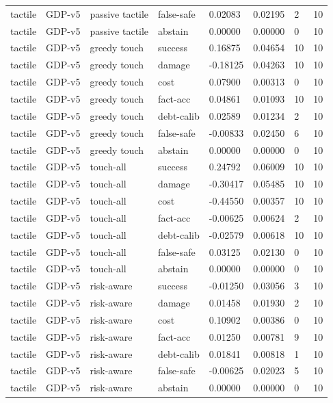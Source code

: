\documentclass{article}
\begin{document}
\begin{center}
\begin{longtable}{llllllll}
tactile & GDP-v5 & passive tactile & false-safe & 0.02083 & 0.02195 & 2 & 10 \\
tactile & GDP-v5 & passive tactile & abstain & 0.00000 & 0.00000 & 0 & 10 \\
tactile & GDP-v5 & greedy touch & success & 0.16875 & 0.04654 & 10 & 10 \\
tactile & GDP-v5 & greedy touch & damage & -0.18125 & 0.04263 & 10 & 10 \\
tactile & GDP-v5 & greedy touch & cost & 0.07900 & 0.00313 & 0 & 10 \\
tactile & GDP-v5 & greedy touch & fact-acc & 0.04861 & 0.01093 & 10 & 10 \\
tactile & GDP-v5 & greedy touch & debt-calib & 0.02589 & 0.01234 & 2 & 10 \\
tactile & GDP-v5 & greedy touch & false-safe & -0.00833 & 0.02450 & 6 & 10 \\
tactile & GDP-v5 & greedy touch & abstain & 0.00000 & 0.00000 & 0 & 10 \\
tactile & GDP-v5 & touch-all & success & 0.24792 & 0.06009 & 10 & 10 \\
tactile & GDP-v5 & touch-all & damage & -0.30417 & 0.05485 & 10 & 10 \\
tactile & GDP-v5 & touch-all & cost & -0.44550 & 0.00357 & 10 & 10 \\
tactile & GDP-v5 & touch-all & fact-acc & -0.00625 & 0.00624 & 2 & 10 \\
tactile & GDP-v5 & touch-all & debt-calib & -0.02579 & 0.00618 & 10 & 10 \\
tactile & GDP-v5 & touch-all & false-safe & 0.03125 & 0.02130 & 0 & 10 \\
tactile & GDP-v5 & touch-all & abstain & 0.00000 & 0.00000 & 0 & 10 \\
tactile & GDP-v5 & risk-aware & success & -0.01250 & 0.03056 & 3 & 10 \\
tactile & GDP-v5 & risk-aware & damage & 0.01458 & 0.01930 & 2 & 10 \\
tactile & GDP-v5 & risk-aware & cost & 0.10902 & 0.00386 & 0 & 10 \\
tactile & GDP-v5 & risk-aware & fact-acc & 0.01250 & 0.00781 & 9 & 10 \\
tactile & GDP-v5 & risk-aware & debt-calib & 0.01841 & 0.00818 & 1 & 10 \\
tactile & GDP-v5 & risk-aware & false-safe & -0.00625 & 0.02023 & 5 & 10 \\
tactile & GDP-v5 & risk-aware & abstain & 0.00000 & 0.00000 & 0 & 10 \\

\end{longtable}
\end{center}
\end{document}
